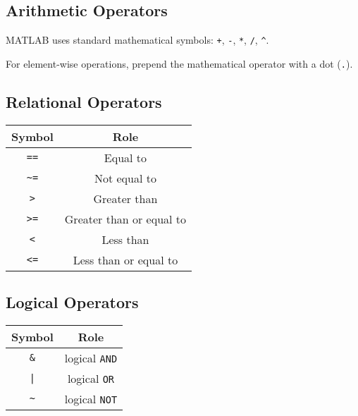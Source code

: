 \documentclass{article}
\begin{document}
\subsection*{Arithmetic Operators}
MATLAB uses standard mathematical symbols: \lstinline!+!, \lstinline!-!, \lstinline!*!, \lstinline!/!, \lstinline!^!.

\noindent For element-wise operations, prepend the mathematical operator with a dot (\lstinline!.!).
\begin{multicols}{2}
    \subsection*{Relational Operators}
    \begin{table}[H]
        \centering
        \begin{tabular}{c | c}
            \toprule
            \textbf{Symbol} & \textbf{Role} \\
            \midrule
            \lstinline!==! & Equal to \\
            \lstinline!~=! & Not equal to \\
            \lstinline!>!  & Greater than \\
            \lstinline!>=! & Greater than or equal to \\
            \lstinline!<!  & Less than \\
            \lstinline!<=! & Less than or equal to \\
            \bottomrule
        \end{tabular}
    \end{table}
    \columnbreak
    \subsection*{Logical Operators}
    \begin{table}[H]
        \centering
        \begin{tabular}{c | c}
            \toprule
            \textbf{Symbol} & \textbf{Role} \\
            \midrule
            \lstinline!&! & logical \lstinline!AND! \\
            \lstinline!|! & logical \lstinline!OR! \\
            \lstinline!~! & logical \lstinline!NOT! \\
            \bottomrule
        \end{tabular}
    \end{table}
\end{multicols}
\end{document}
